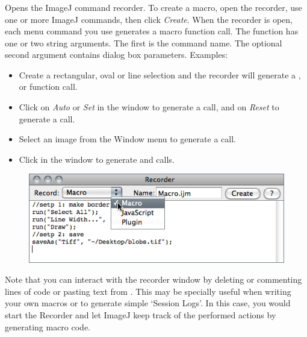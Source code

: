 \subsubsection{\protect{}\label{sub:Record...}}

Opens
the ImageJ command recorder. To create a macro, open the recorder,
use one or more ImageJ commands, then click \emph{Create}. When the
recorder is open, each menu command you use generates a macro 
function call. The  function has one or two string arguments.
The first is the command name. The optional second argument contains
dialog box parameters. Examples:
\begin{itemize}
\item Create a rectangular, oval or line selection and the recorder will
generate a ,  or
 function call. 
\item Click on \emph{Auto} or \emph{Set} in the 
window to generate a  call, and on \emph{Reset}
to generate a  call. 
\item Select an image from the Window menu to generate a 
call. 
\item Click in the 
window to generate  and 
calls.
\end{itemize}
\begin{figure}[h]
\noindent \centering{}\includegraphics[scale=0.65]{images/Recorder}
\end{figure}


Note that you can interact with the recorder window by deleting or
commenting lines of code or pasting text from .
This may be specially useful when writing your own macros or to generate
simple `Session Logs'. In this case, you would start the Recorder
and let ImageJ keep track of the performed actions by generating macro
code.


